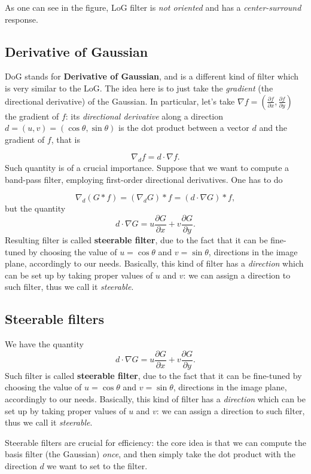 \documentclass[10pt]{report}
\begin{document}
As one can see in the figure, LoG filter is \emph{not oriented} and has a
\emph{center-surround} response.

\subsection{Derivative of Gaussian}
\label{derivative-of-gaussian}
DoG stands for \textbf{Derivative of Gaussian}, and is a different kind of
filter which is very similar to the LoG. The idea here is to just take
the \emph{gradient} (the directional derivative) of the Gaussian. In
particular, let's take
\(\nabla f = (\frac{\partial f}{\partial x}, \frac{\partial f}{\partial y})\)
the gradient of \(f\): its \emph{directional derivative} along a direction
\(d = (u, v) = (\cos\theta, \sin\theta)\) is the dot product between a
vector \(d\) and the gradient of \(f\), that is

\[\nabla_d f = d \cdot \nabla f.\] Such quantity is of a crucial
importance. Suppose that we want to compute a band-pass filter,
employing first-order directional derivatives. One has to do

\[\nabla_d (G * f) = (\nabla_d G) * f = (d \cdot \nabla G) * f,\] but
the quantity
\[d \cdot \nabla G = u\frac{\partial G}{\partial x} + v\frac{\partial G}{\partial y}.\]
Resulting filter is called \textbf{steerable filter}, due to the fact that it
can be fine-tuned by choosing the value of \(u = \cos\theta\) and
\(v=\sin\theta\), directions in the image plane, accordingly to our
needs. Basically, this kind of filter has a \emph{direction} which can be set
up by taking proper values of \(u\) and \(v\): we can assign a direction
to such filter, thus we call it \emph{steerable}.

\subsection{Steerable filters}
\label{steerable-filters}
We have the quantity
\[d \cdot \nabla G = u\frac{\partial G}{\partial x} + v\frac{\partial G}{\partial y}.\]
Such filter is called \textbf{steerable filter}, due to the fact that it can be
fine-tuned by choosing the value of \(u = \cos\theta\) and
\(v=\sin\theta\), directions in the image plane, accordingly to our
needs. Basically, this kind of filter has a \emph{direction} which can be set
up by taking proper values of \(u\) and \(v\): we can assign a direction
to such filter, thus we call it \emph{steerable}.

Steerable filters are crucial for efficiency: the core idea is that we
can compute the basis filter (the Gaussian) \emph{once}, and then simply take
the dot product with the direction \(d\) we want to set to the filter.
\end{document}
